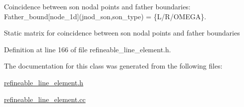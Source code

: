 Coincidence between son nodal points and father boundaries\+: Father\+\_\+bound\mbox{[}node\+\_\+1d\mbox{]}(jnod\+\_\+son,son\+\_\+type) = \{L/\+R/\+O\+M\+E\+GA\}. 

Static matrix for coincidence between son nodal points and father boundaries 

Definition at line 166 of file refineable\+\_\+line\+\_\+element.\+h.



The documentation for this class was generated from the following files\+:\begin{DoxyCompactItemize}
\item 
\hyperlink{refineable__line__element_8h}{refineable\+\_\+line\+\_\+element.\+h}\item 
\hyperlink{refineable__line__element_8cc}{refineable\+\_\+line\+\_\+element.\+cc}\end{DoxyCompactItemize}
